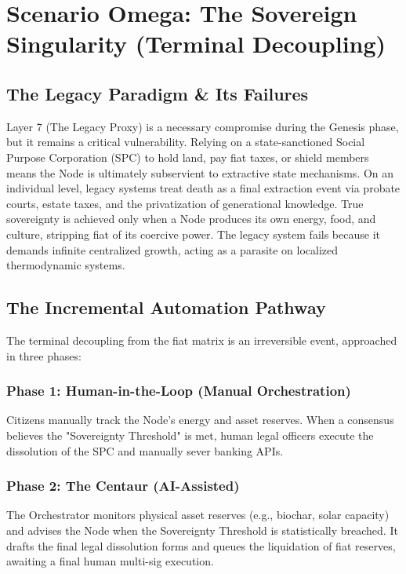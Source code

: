 \chapter{Scenario Omega: The Sovereign Singularity (Terminal Decoupling)}

\section{The Legacy Paradigm \& Its Failures}
Layer 7 (The Legacy Proxy) is a necessary compromise during the Genesis phase, but it remains a critical vulnerability. Relying on a state-sanctioned Social Purpose Corporation (SPC) to hold land, pay fiat taxes, or shield members means the Node is ultimately subservient to extractive state mechanisms. On an individual level, legacy systems treat death as a final extraction event via probate courts, estate taxes, and the privatization of generational knowledge. True sovereignty is achieved only when a Node produces its own energy, food, and culture, stripping fiat of its coercive power. The legacy system fails because it demands infinite centralized growth, acting as a parasite on localized thermodynamic systems.

\section{The Incremental Automation Pathway}
The terminal decoupling from the fiat matrix is an irreversible event, approached in three phases:

\subsection{Phase 1: Human-in-the-Loop (Manual Orchestration)}
Citizens manually track the Node's energy and asset reserves. When a consensus believes the "Sovereignty Threshold" is met, human legal officers execute the dissolution of the SPC and manually sever banking APIs.

\subsection{Phase 2: The Centaur (AI-Assisted)}
The Orchestrator monitors physical asset reserves (e.g., biochar, solar capacity) and advises the Node when the Sovereignty Threshold is statistically breached. It drafts the final legal dissolution forms and queues the liquidation of fiat reserves, awaiting a final human multi-sig execution.

